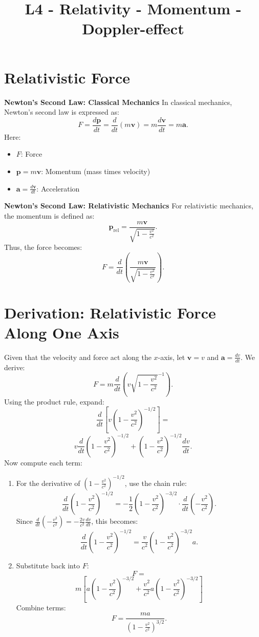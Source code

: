 \documentclass[a4paper,12pt]{article}
\begin{document}
\title{L4 - Relativity - Momentum - Doppler-effect}
\author{}
\date{}
\maketitle
\begin{multicols}{2}

\section*{Relativistic Force}
\textbf{Newton's Second Law: Classical Mechanics}  
In classical mechanics, Newton's second law is expressed as:
\[
F = \frac{d\mathbf{p}}{dt} = \frac{d}{dt}(m\mathbf{v}) = m\frac{d\mathbf{v}}{dt} = m\mathbf{a}.
\]
Here:
\begin{itemize}
    \item \( F \): Force
    \item \( \mathbf{p} = m\mathbf{v} \): Momentum (mass times velocity)
    \item \( \mathbf{a} = \frac{d\mathbf{v}}{dt} \): Acceleration
\end{itemize}

\textbf{Newton's Second Law: Relativistic Mechanics}  
For relativistic mechanics, the momentum is defined as:
\[
\mathbf{p}_{\text{rel}} = \frac{m\mathbf{v}}{\sqrt{1 - \frac{v^2}{c^2}}}.
\]
Thus, the force becomes:
\[
F = \frac{d}{dt}\left( \frac{m\mathbf{v}}{\sqrt{1 - \frac{v^2}{c^2}}} \right).
\]

\section*{Derivation: Relativistic Force Along One Axis}
Given that the velocity and force act along the \(x\)-axis, let \( \mathbf{v} = v \) and \( \mathbf{a} = \frac{dv}{dt} \). We derive:
\[
F = m\frac{d}{dt}\left(v \sqrt{1 - \frac{v^2}{c^2}}^{-1}\right).
\]
Using the product rule, expand:
\[
\frac{d}{dt}\left[v (1 - \frac{v^2}{c^2})^{-1/2}\right] = 
\]
\[
v\frac{d}{dt}(1 - \frac{v^2}{c^2})^{-1/2} + (1 - \frac{v^2}{c^2})^{-1/2}\frac{dv}{dt}.
\]
Now compute each term:
\begin{enumerate}
    \item For the derivative of \((1 - \frac{v^2}{c^2})^{-1/2}\), use the chain rule:
    \[
    \frac{d}{dt}(1 - \frac{v^2}{c^2})^{-1/2} = -\frac{1}{2}(1 - \frac{v^2}{c^2})^{-3/2}\cdot\frac{d}{dt}(-\frac{v^2}{c^2}).
    \]
    Since \(\frac{d}{dt}(-\frac{v^2}{c^2}) = -\frac{2v}{c^2}\frac{dv}{dt}\), this becomes:
    \[
    \frac{d}{dt}(1 - \frac{v^2}{c^2})^{-1/2} = \frac{v}{c^2}(1 - \frac{v^2}{c^2})^{-3/2}a.
    \]
    \item Substitute back into \(F\):
    \[
    F = 
    \]
    \[
    m\left[a(1 - \frac{v^2}{c^2})^{-3/2} + \frac{v^2}{c^2}a(1 - \frac{v^2}{c^2})^{-3/2}\right]
    \]
    Combine terms:
    \[
    F = \frac{ma}{(1 - \frac{v^2}{c^2})^{3/2}}.
    \]
\end{enumerate}


\end{multicols}
\end{document}
